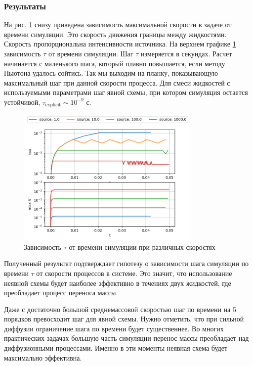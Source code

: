 \subsubsection*{Результаты}
На рис. \ref{fig:t_tau} снизу приведена зависимость максимальной скорости в задаче от времени симуляции. Это скорость движения границы между жидкостями. Скорость пропорциональна интенсивности источника. На верхнем графике \ref{fig:t_tau} зависимость $\tau$ от времени симуляции. Шаг $\tau$ измеряется в секундах.
Расчет начинается с маленького шага, который плавно повышается, если методу Ньютона удалось сойтись. Так мы выходим на планку, показывающую максимальный шаг при данной скорости процесса. Для смеси жидкостей с используемыми параметрами шаг явной схемы, при котором симуляция остается устойчивой, $\tau_{\textrm{explicit}} \sim 10^{-9}$ с.
\begin{figure}[H]
\centering
\includegraphics[width=0.8\textwidth]{dhd_t_tau/t_tau.png}
\caption{Зависимость $\tau$ от времени симуляции при различных скоростях}
\label{fig:t_tau}
\end{figure}
Полученный результат подтверждает гипотезу о зависимости шага симуляции по времени $\tau$ от скорости процессов в системе. Это значит, что использование неявной схемы будет наиболее эффективно в течениях двух жидкостей, где преобладает процесс переноса массы.
\par
Даже с достаточно большой среднемассовой скоростью шаг по времени на 5 порядков превосходит шаг для явной схемы. Нужно отметить, что при сильной диффузии ограничение шага по времени будет существеннее.  Во многих практических задачах большую часть симуляции перенос массы преобладает над диффузионными процессами. Именно в эти моменты неявная схема будет максимально эффективна.
